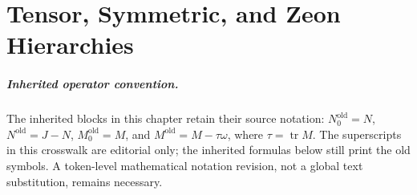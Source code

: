 \chapter{Tensor, Symmetric, and Zeon Hierarchies}
\label{organized:hierarchy}
\label{chapterseven}

\paragraph{Inherited operator convention.}
The inherited blocks in this chapter retain their source notation:
$N_0^{\mathrm{old}}=N$,
$N^{\mathrm{old}}=J-N$,
$M_0^{\mathrm{old}}=M$, and
$M^{\mathrm{old}}=M-\tau\omega$, where $\tau=\operatorname{tr}M$.
The superscripts in this crosswalk are editorial only; the inherited
formulas below still print the old symbols. A token-level mathematical
notation revision, not a global text substitution, remains necessary.





